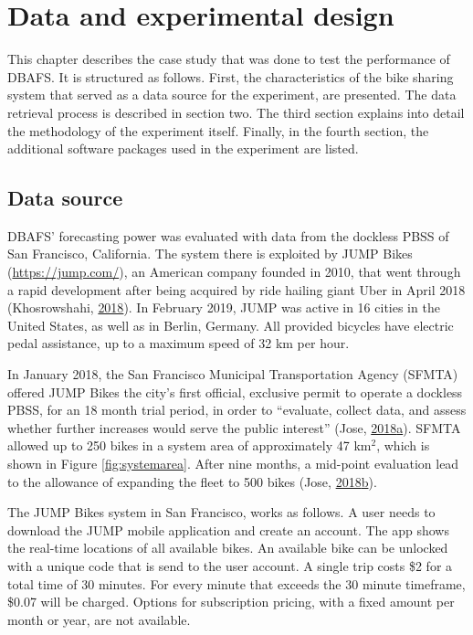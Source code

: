 \documentclass[12pt,oneside]{reedthesis}
\begin{document}
\chapter{Data and experimental design}\label{four}

This chapter describes the case study that was done to test the
performance of DBAFS. It is structured as follows. First, the
characteristics of the bike sharing system that served as a data source
for the experiment, are presented. The data retrieval process is
described in section two. The third section explains into detail the
methodology of the experiment itself. Finally, in the fourth section,
the additional software packages used in the experiment are listed.

\section{Data source}\label{fourone}

DBAFS' forecasting power was evaluated with data from the dockless PBSS
of San Francisco, California. The system there is exploited by JUMP
Bikes (\url{https://jump.com/}), an American company founded in 2010,
that went through a rapid development after being acquired by ride
hailing giant Uber in April 2018 (Khosrowshahi,
\protect\hyperlink{ref-uber2018}{2018}). In February 2019, JUMP was
active in 16 cities in the United States, as well as in Berlin, Germany.
All provided bicycles have electric pedal assistance, up to a maximum
speed of 32 km per hour.

In January 2018, the San Francisco Municipal Transportation Agency
(SFMTA) offered JUMP Bikes the city's first official, exclusive permit
to operate a dockless PBSS, for an 18 month trial period, in order to
``evaluate, collect data, and assess whether further increases would
serve the public interest'' (Jose,
\protect\hyperlink{ref-sfmta2018one}{2018}\protect\hyperlink{ref-sfmta2018one}{a}).
SFMTA allowed up to 250 bikes in a system area of approximately 47
km\(^2\), which is shown in Figure \ref{fig:systemarea}. After nine
months, a mid-point evaluation lead to the allowance of expanding the
fleet to 500 bikes (Jose,
\protect\hyperlink{ref-sfmta2018two}{2018}\protect\hyperlink{ref-sfmta2018two}{b}).

The JUMP Bikes system in San Francisco, works as follows. A user needs
to download the JUMP mobile application and create an account. The app
shows the real-time locations of all available bikes. An available bike
can be unlocked with a unique code that is send to the user account. A
single trip costs \$2 for a total time of 30 minutes. For every minute
that exceeds the 30 minute timeframe, \$0.07 will be charged. Options
for subscription pricing, with a fixed amount per month or year, are not
available.
\end{document}
